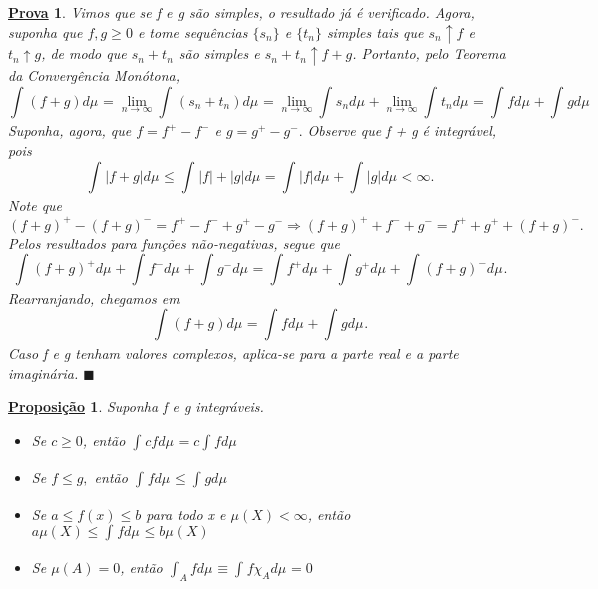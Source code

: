\documentclass{article}
\newtheorem*{prop*}{\underline{Proposi\c c\~ao}}
\newtheorem*{proof*}{\underline{Prova}}
\renewcommand\qedsymbol{$\blacksquare$}
\begin{document}
\begin{proof*}
  Vimos que se f e g são simples, o resultado já é verificado. Agora, suponha que \(f, g \geq 0\) e tome sequências \(\{s_{n}\}\) e \(\{t_{n}\}\) simples tais que 
  \(s_{n}\uparrow f\) e \(t_{n}\uparrow g\), de modo que \(s_{n}+t_{n}\) são simples e \(s_{n}+t_{n}\uparrow f+g\). Portanto, pelo Teorema da Convergência Monótona,
    \[
      \int_{}(f+g) d\mu_{} = \lim_{n\to \infty}\int_{}(s_{n} + t_{n}) d\mu_{} = \lim_{n\to \infty}\int_{}s_{n} d\mu_{} + \lim_{n\to \infty}\int_{}t_{n} d\mu_{} = \int_{}f d\mu_{} + \int_{}g d\mu_{}    
    \]
  Suponha, agora, que \(f = f^{+} - f^{-}\) e \(g = g^{+}-g^{-}.\) Observe que f + g é integrável, pois 
    \[
      \int_{}|f+g| d\mu_{} \leq \int_{}|f| + |g| d\mu_{} = \int_{}|f| d\mu_{} + \int_{}|g| d\mu_{} < \infty.
    \]  
  Note que 
    \[
      (f+g)^{+} - (f+g)^{-} = f^{+} - f^{-} + g^{+}-g^{-} \Rightarrow (f+g)^{+} + f^{-} + g^{-} = f^{+} + g^{+} + (f+g)^{-}.
    \]
  Pelos resultados para funções não-negativas, segue que 
    \[
      \int_{}(f+g)^{+} d\mu_{} + \int_{}f^{-} d\mu_{} + \int_{}g^{-} d\mu_{} = \int_{}f^{+} d\mu_{} + \int_{}g^{+} d\mu_{} + \int_{}(f+g)^{-} d\mu_{}.
    \]
  Rearranjando, chegamos em 
    \[
      \int_{}(f+g) d\mu_{} = \int_{}f d\mu_{} + \int_{}g d\mu_{}.
    \]
  Caso f e g tenham valores complexos, aplica-se para a parte real e a parte imaginária. \qedsymbol
\end{proof*}
\begin{prop*}
  Suponha f e g integráveis. 
 \begin{itemize}
   \item[i)] Se \(c\geq 0\), então \(\int_{}cf d\mu_{} = c \int_{}f d\mu_{}\)
     \item[ii)] Se \(f \leq g,\) então \(\int_{}f d\mu_{} \leq \int_{}g d\mu_{}\)
       \item[iii)] Se \(a\leq f(x) \leq b\) para todo x e \(\mu (X) < \infty\), então \(a\mu (X) \leq \int_{}f d\mu_{} \leq b\mu (X)\)
         \item[iv)] Se \(\mu (A) = 0\), então \(\int_{A}f d\mu_{}\equiv \int_{}f \chi_{A} d\mu_{} = 0\)
 \end{itemize}
\end{prop*}
\end{document}
